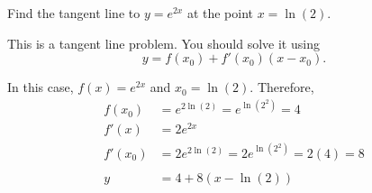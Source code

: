 \documentclass{ximera}
\author{Emma Smith Zbarsky}
\begin{document}
\begin{exercise}

Find the tangent line to $y=e^{2x}$ at the point $x=\ln(2)$.


\begin{hint}
This is a tangent line problem. You should solve it using
\[y = f(x_0)+f'(x_0)(x-x_0).\]
\end{hint}


\begin{hint}
In this case, $f(x) = e^{2x}$ and $x_0 = \ln(2)$. Therefore,
\begin{align*}
f(x_0) &= e^{2\ln(2)} = e^{\ln(2^2)} = 4 \\
f'(x) &= 2e^{2x} \\
f'(x_0) &= 2e^{2\ln(2)} = 2e^{\ln(2^2)} = 2(4) = 8 \\
& \\
y&= 4+8(x-\ln(2))
\end{align*}
\end{hint}


\begin{multipleChoice}
\end{multipleChoice}

\end{exercise}
\end{document}
